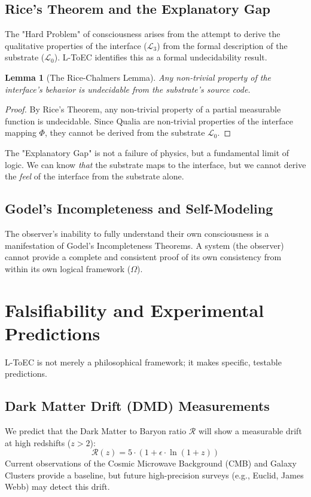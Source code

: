 \documentclass[11pt,onecolumn]{article}
\newcommand{\substrate}{\mathcal{L}_0}
\newcommand{\interface}{\mathcal{L}_3}
\newcommand{\classifier}{\Omega}
\newtheorem{lemma}{Lemma}
\begin{document}
\subsection{Rice's Theorem and the Explanatory Gap}
The "Hard Problem" of consciousness arises from the attempt to derive the qualitative properties of the interface ($\interface$) from the formal description of the substrate ($\substrate$). L-ToEC identifies this as a formal undecidability result.
\begin{lemma}[The Rice-Chalmers Lemma]
Any non-trivial property of the interface's behavior is undecidable from the substrate's source code.
\end{lemma}
\begin{proof}
By Rice's Theorem, any non-trivial property of a partial measurable function is undecidable. Since Qualia are non-trivial properties of the interface mapping $\Phi$, they cannot be derived from the substrate $\substrate$.
\end{proof}
The "Explanatory Gap" is not a failure of physics, but a fundamental limit of logic. We can know \textit{that} the substrate maps to the interface, but we cannot derive the \textit{feel} of the interface from the substrate alone.

\subsection{Godel's Incompleteness and Self-Modeling}
The observer's inability to fully understand their own consciousness is a manifestation of Godel's Incompleteness Theorems. A system (the observer) cannot provide a complete and consistent proof of its own consistency from within its own logical framework ($\classifier$).

\section{Falsifiability and Experimental Predictions}

L-ToEC is not merely a philosophical framework; it makes specific, testable predictions.

\subsection{Dark Matter Drift (DMD) Measurements}
We predict that the Dark Matter to Baryon ratio $\mathcal{R}$ will show a measurable drift at high redshifts ($z > 2$):
\begin{equation}
\mathcal{R}(z) = 5 \cdot (1 + \epsilon \cdot \ln(1+z))
\end{equation}
Current observations of the Cosmic Microwave Background (CMB) and Galaxy Clusters provide a baseline, but future high-precision surveys (e.g., Euclid, James Webb) may detect this drift.
\end{document}
